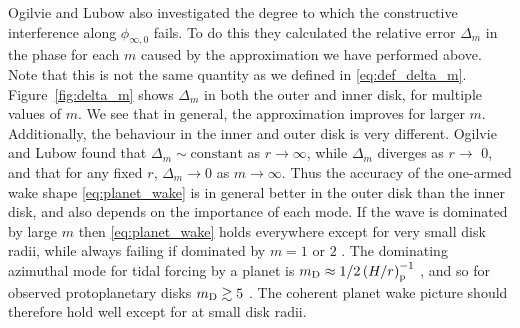 Ogilvie and Lubow also investigated the degree to which the constructive interference along $\phi_{\infty,0}$ fails.
To do this they calculated the relative error $\Delta_m$ in the phase for each $m$ caused by the approximation we have performed above.
Note that this is not the same quantity as we defined in \eqref{eq:def_delta_m}.
Figure~\ref{fig:delta_m} shows $\Delta_m$ in both the outer and inner disk, for multiple values of $m$.
We see that in general, the approximation improves for larger $m$.
Additionally, the behaviour in the inner and outer disk is very different.
Ogilvie and Lubow found that $\Delta_m \sim \mathrm{constant}$ as $r \rightarrow \infty$, while $\Delta_m$ diverges as $r \rightarrow$ 0, and that for any fixed $r$, $\Delta_m \rightarrow 0$ as $m \rightarrow \infty$.
Thus the accuracy of the one-armed wake shape \eqref{eq:planet_wake} is in general better in the outer disk than the inner disk, and also depends on the importance of each mode.
If the wave is dominated by large $m$ then \eqref{eq:planet_wake} holds everywhere except for very small disk radii, while always failing if dominated by $m=1$ or $2$ \citep{ogilvie2002}.
The dominating azimuthal mode for tidal forcing by a planet is $m_{\rm D} \approx 1/2 \left( H/r \right)_{\rm p}^{-1}$ \citep{goldreich1980}, and so for observed protoplanetary disks $m_{\rm D} \gtrsim 5$ \citep{law2021a}. 
The coherent planet wake picture should therefore hold well except for at small disk radii.

